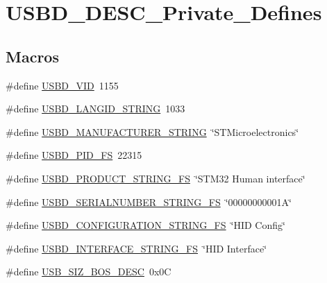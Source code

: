 \hypertarget{group__USBD__DESC__Private__Defines}{}\section{U\+S\+B\+D\+\_\+\+D\+E\+S\+C\+\_\+\+Private\+\_\+\+Defines}
\label{group__USBD__DESC__Private__Defines}
\subsection*{Macros}
\begin{DoxyCompactItemize}
\item 
\#define \hyperlink{group__USBD__DESC__Private__Defines_gac5251397ce2246b546b472cd802e6d62}{U\+S\+B\+D\+\_\+\+V\+ID}~1155
\item 
\#define \hyperlink{group__USBD__DESC__Private__Defines_ga070dd542d4d914e86fdf103fa5fdd72f}{U\+S\+B\+D\+\_\+\+L\+A\+N\+G\+I\+D\+\_\+\+S\+T\+R\+I\+NG}~1033
\item 
\#define \hyperlink{group__USBD__DESC__Private__Defines_gaee0c9fd7e8265b90126028919cd863a6}{U\+S\+B\+D\+\_\+\+M\+A\+N\+U\+F\+A\+C\+T\+U\+R\+E\+R\+\_\+\+S\+T\+R\+I\+NG}~\char`\"{}S\+T\+Microelectronics\char`\"{}
\item 
\#define \hyperlink{group__USBD__DESC__Private__Defines_gaa6f9e36da39c9881963cabf42df4d216}{U\+S\+B\+D\+\_\+\+P\+I\+D\+\_\+\+FS}~22315
\item 
\#define \hyperlink{group__USBD__DESC__Private__Defines_gaa11017e20e3a2f1ef891b86212c4b730}{U\+S\+B\+D\+\_\+\+P\+R\+O\+D\+U\+C\+T\+\_\+\+S\+T\+R\+I\+N\+G\+\_\+\+FS}~\char`\"{}S\+T\+M32 Human interface\char`\"{}
\item 
\#define \hyperlink{group__USBD__DESC__Private__Defines_ga0057246fa742e75846bb0467a84921fc}{U\+S\+B\+D\+\_\+\+S\+E\+R\+I\+A\+L\+N\+U\+M\+B\+E\+R\+\_\+\+S\+T\+R\+I\+N\+G\+\_\+\+FS}~\char`\"{}00000000001\+A\char`\"{}
\item 
\#define \hyperlink{group__USBD__DESC__Private__Defines_gaca5e66e8b6c89a896f6ad16f9a68128f}{U\+S\+B\+D\+\_\+\+C\+O\+N\+F\+I\+G\+U\+R\+A\+T\+I\+O\+N\+\_\+\+S\+T\+R\+I\+N\+G\+\_\+\+FS}~\char`\"{}H\+ID Config\char`\"{}
\item 
\#define \hyperlink{group__USBD__DESC__Private__Defines_ga2562ccc9162020b79f07d813eba10ddb}{U\+S\+B\+D\+\_\+\+I\+N\+T\+E\+R\+F\+A\+C\+E\+\_\+\+S\+T\+R\+I\+N\+G\+\_\+\+FS}~\char`\"{}H\+ID Interface\char`\"{}
\item 
\#define \hyperlink{group__USBD__DESC__Private__Defines_ga3d6767367e9b15bae8d264a78102aba8}{U\+S\+B\+\_\+\+S\+I\+Z\+\_\+\+B\+O\+S\+\_\+\+D\+E\+SC}~0x0C
\end{DoxyCompactItemize}


